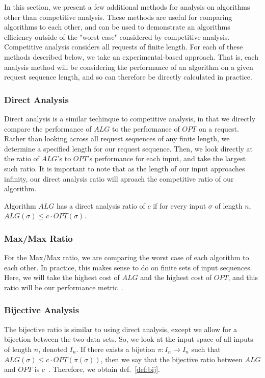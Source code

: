 In this section, we present a few additional methods for analysis on algorithms other than competitive analysis. These methods are useful for comparing algorithms to each other, and can be used to demonstrate an algorithms efficiency outside of the "worst-case" considered by competitive analysis. Competitive analysis considers all requests of finite length. For each of these methods described below, we take an experimental-based approach. That is, each analysis method will be considering the performance of an algorithm on a given request sequence length, and so can therefore be directly calculated in practice.

\subsubsection*{Direct Analysis}
\label{sec:Direct}
Direct analysis is a similar techinque to competitive analysis, in that we directly compare the performance of $ALG$ to the performance of $OPT$ on a request. Rather than looking across all request sequences of any finite length, we determine a specified length for our request sequence. Then, we look directly at the ratio of $ALG$'s to $OPT$'s performance for each input, and take the largest such ratio. It is important to note that as the length of our input approaches infinity, our direct analysis ratio will aproach the competitive ratio of our algorithm.

\begin{definition}
    \label{def:direct}
    Algorithm $ALG$ has a direct analysis ratio of $c$ if for every input $\sigma$ of length $n$, $ALG(\sigma) \leq c\cdot OPT(\sigma)$.
\end{definition}

\subsubsection*{Max/Max Ratio}
\label{sec:MaxMax}
For the Max/Max ratio, we are comparing the worst case of each algorithm to each other. In practice, this makes sense to do on finite sets of input sequences. Here, we will take the highest cost of $ALG$ and the highest cost of $OPT$, and this ratio will be our performance metric~\cite{MAXMAX2005}. 

\subsubsection*{Bijective Analysis}
\label{sec:Bij}
The bijective ratio is similar to using direct analysis, except we allow for a bijection between the two data sets. So, we look at the input space of all inputs of length $n$, denoted $I_n$. If there exists a bijetion $\pi:I_n \rightarrow I_n$ such that $ALG(\sigma) \leq c\cdot OPT(\pi(\sigma))$, then  we say that the bijective ratio between $ALG$ and $OPT$ is $c$~\cite{bij2016}. Therefore, we obtain def.~\ref{def:bij}. 

